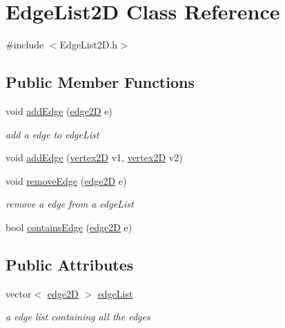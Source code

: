 \hypertarget{class_edge_list2_d}{}\section{Edge\+List2D Class Reference}
\label{class_edge_list2_d}


{\ttfamily \#include $<$Edge\+List2\+D.\+h$>$}

\subsection*{Public Member Functions}
\begin{DoxyCompactItemize}
\item 
void \mbox{\hyperlink{class_edge_list2_d_a0887cfff4dfd1f5c0165750f69f0822a}{add\+Edge}} (\mbox{\hyperlink{structedge2_d}{edge2D}} e)
\begin{DoxyCompactList}\small\item\em add a edge to edge\+List \end{DoxyCompactList}\item 
void \mbox{\hyperlink{class_edge_list2_d_ad0085ac0f30c9135a8193bfef627e57f}{add\+Edge}} (\mbox{\hyperlink{structvertex2_d}{vertex2D}} v1, \mbox{\hyperlink{structvertex2_d}{vertex2D}} v2)
\item 
void \mbox{\hyperlink{class_edge_list2_d_a33ad68f25aa0a9b35af5d983e4effd0b}{remove\+Edge}} (\mbox{\hyperlink{structedge2_d}{edge2D}} e)
\begin{DoxyCompactList}\small\item\em remove a edge from a edge\+List \end{DoxyCompactList}\item 
bool \mbox{\hyperlink{class_edge_list2_d_a9d5ecf2dd50e5f75e189b9588ae784cc}{contains\+Edge}} (\mbox{\hyperlink{structedge2_d}{edge2D}} e)
\end{DoxyCompactItemize}
\subsection*{Public Attributes}
\begin{DoxyCompactItemize}
\item 
vector$<$ \mbox{\hyperlink{structedge2_d}{edge2D}} $>$ \mbox{\hyperlink{class_edge_list2_d_a2e1dfffec9f77e762ecf1aef5b1f428b}{edge\+List}}
\begin{DoxyCompactList}\small\item\em a edge list containing all the edges \end{DoxyCompactList}\end{DoxyCompactItemize}


